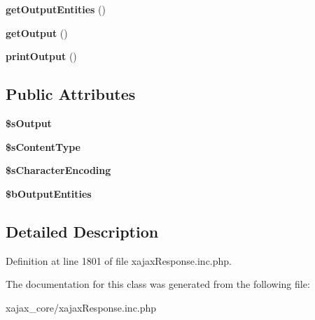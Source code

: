 \begin{DoxyCompactItemize}
\item 
\hypertarget{classxajaxCustomResponse_a1831680d5bd06664e706d148deae7311}{
{\bfseries getOutputEntities} ()}
\label{classxajaxCustomResponse_a1831680d5bd06664e706d148deae7311}

\item 
\hypertarget{classxajaxCustomResponse_a071c4d6514f05409fccad88724a25f6a}{
{\bfseries getOutput} ()}
\label{classxajaxCustomResponse_a071c4d6514f05409fccad88724a25f6a}

\item 
\hypertarget{classxajaxCustomResponse_a4c1d624855329d21f6389eb951435b88}{
{\bfseries printOutput} ()}
\label{classxajaxCustomResponse_a4c1d624855329d21f6389eb951435b88}

\end{DoxyCompactItemize}
\subsection*{Public Attributes}
\begin{DoxyCompactItemize}
\item 
\hypertarget{classxajaxCustomResponse_aa7d9bd8d8e51374c8a29b53652e820a4}{
{\bfseries \$sOutput}}
\label{classxajaxCustomResponse_aa7d9bd8d8e51374c8a29b53652e820a4}

\item 
\hypertarget{classxajaxCustomResponse_a52b33807ccd657de0c382b5eaa017840}{
{\bfseries \$sContentType}}
\label{classxajaxCustomResponse_a52b33807ccd657de0c382b5eaa017840}

\item 
\hypertarget{classxajaxCustomResponse_a7ae05b8defcc608e93666d2b1553a183}{
{\bfseries \$sCharacterEncoding}}
\label{classxajaxCustomResponse_a7ae05b8defcc608e93666d2b1553a183}

\item 
\hypertarget{classxajaxCustomResponse_a89eea6d9d4002e33fe02d914c9c8cfa5}{
{\bfseries \$bOutputEntities}}
\label{classxajaxCustomResponse_a89eea6d9d4002e33fe02d914c9c8cfa5}

\end{DoxyCompactItemize}


\subsection{Detailed Description}


Definition at line 1801 of file xajaxResponse.inc.php.



The documentation for this class was generated from the following file:\begin{DoxyCompactItemize}
\item 
xajax\_\-core/xajaxResponse.inc.php\end{DoxyCompactItemize}
